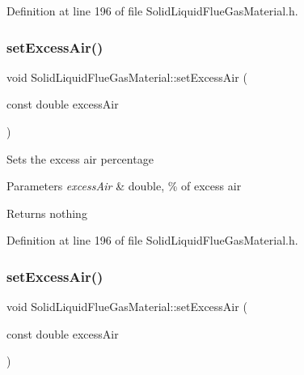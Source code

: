 Definition at line 196 of file Solid\+Liquid\+Flue\+Gas\+Material.\+h.

\mbox{\label{class_solid_liquid_flue_gas_material_a7a3f9f77d267afc05f5fde1da9329ec5}} 
\subsubsection{\texorpdfstring{set\+Excess\+Air()}{setExcessAir()}\hspace{0.1cm}{\footnotesize\ttfamily [2/3]}}
{\footnotesize\ttfamily void Solid\+Liquid\+Flue\+Gas\+Material\+::set\+Excess\+Air (\begin{DoxyParamCaption}\item[{const double}]{excess\+Air }\end{DoxyParamCaption})\hspace{0.3cm}{\ttfamily [inline]}}

Sets the excess air percentage 
\begin{DoxyParams}{Parameters}
{\em excess\+Air} & double, \% of excess air \\
\hline
\end{DoxyParams}
\begin{DoxyReturn}{Returns}
nothing 
\end{DoxyReturn}


Definition at line 196 of file Solid\+Liquid\+Flue\+Gas\+Material.\+h.

\mbox{\label{class_solid_liquid_flue_gas_material_a7a3f9f77d267afc05f5fde1da9329ec5}} 
\subsubsection{\texorpdfstring{set\+Excess\+Air()}{setExcessAir()}\hspace{0.1cm}{\footnotesize\ttfamily [3/3]}}
{\footnotesize\ttfamily void Solid\+Liquid\+Flue\+Gas\+Material\+::set\+Excess\+Air (\begin{DoxyParamCaption}\item[{const double}]{excess\+Air }\end{DoxyParamCaption})\hspace{0.3cm}{\ttfamily [inline]}}

